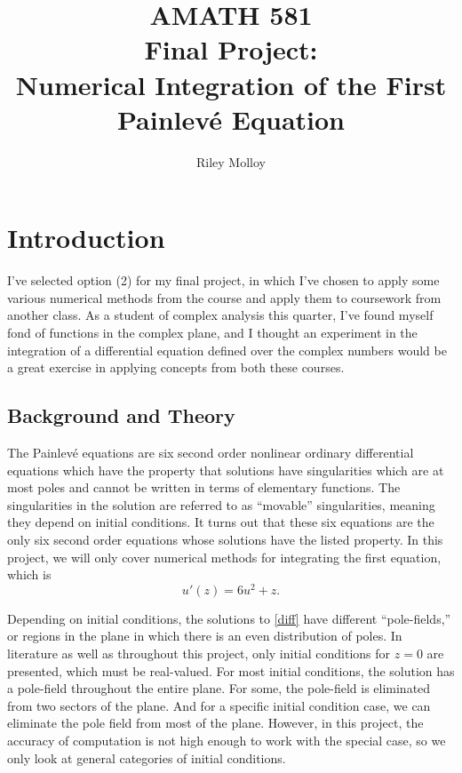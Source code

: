 \documentclass[12pt]{article}
\title{AMATH 581\\
Final Project:\\
Numerical Integration of the First Painlev\'{e} Equation}
\author{Riley Molloy}
\date{}
\begin{document}
\maketitle

\section{Introduction}
I've selected option (2) for my final project, in which I've chosen to apply some various numerical methods from the course and apply them to coursework from another class. As a student of complex analysis this quarter, I've found myself fond of functions in the complex plane, and I thought an experiment in the integration of a differential equation defined over the complex numbers would be a great exercise in applying concepts from both these courses. 

\subsection{Background and Theory}
The Painlev\'{e} equations are six second order nonlinear ordinary differential equations which have the property that solutions have singularities which are at most poles and cannot be written in terms of elementary functions. The singularities in the solution are referred to as ``movable'' singularities, meaning they depend on initial conditions. It turns out that these six equations are the only six second order equations whose solutions have the listed property. In this project, we will only cover numerical methods for integrating the first equation, which is 
\begin{equation} \label{diff}
u'(z) = 6u^2 + z.
\end{equation}

Depending on initial conditions, the solutions to \eqref{diff} have different ``pole-fields,'' or regions in the plane in which there is an even distribution of poles. In literature as well as throughout this project, only initial conditions for $z = 0$ are presented, which must be real-valued. For most initial conditions, the solution has a pole-field throughout the entire plane. For some, the pole-field is eliminated from two sectors of the plane. And for a specific initial condition case, we can eliminate the pole field from most of the plane. However, in this project, the accuracy of computation is not high enough to work with the special case, so we only look at general categories of initial conditions. 
\end{document}
